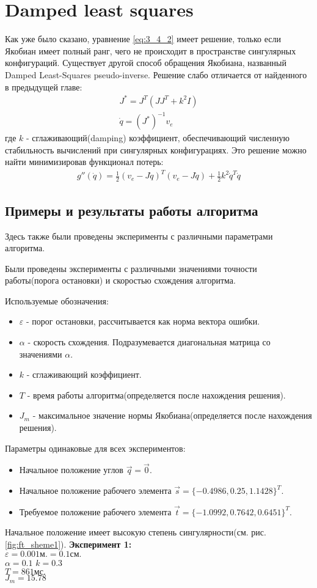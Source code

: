 \section{Damped least squares} \label{sect:3_5}
Как уже было сказано, уравнение \ref{eq:3_4_2} имеет решение, только если Якобиан имеет полный ранг, чего не происходит в пространстве сингулярных конфигураций. Существует другой способ обращения Якобиана, названный Damped Least-Squares pseudo-inverse. Решение слабо отличается от найденного в предыдущей главе:
\begin{align}
	J^{*} = J^{T}(JJ^{T} + k^{2}I)\\
	\dot{q} = (J^{*})^{-1}v_{e}
\end{align}
где $k$ - сглаживающий(damping) коэффициент, обеспечивающий численную стабильность вычислений при сингулярных конфигурациях. Это решение можно найти минимизировав функционал потерь\cite{Bruno}:
\begin{align}
	g''(\dot{q}) = \frac{1}{2}(v_{e} - J\dot{q})^{T}(v_{e} - J\dot{q}) + \frac{1}{2}k^{2}\dot{q}^{T}\dot{q}
\end{align}

\subsection{Примеры и результаты работы алгоритма}\label{subsect:3_5_1}
Здесь также были проведены эксперименты с различными параметрами алгоритма.

	Были проведены эксперименты с различными значениями точности работы(порога остановки) и скоростью схождения алгоритма.

Используемые обозначения:
\begin{itemize}
	\item $\varepsilon$ - порог остановки, рассчитывается как норма вектора ошибки.
	\item $\alpha$ - скорость схождения. Подразумевается диагональная матрица со значениями $\alpha$.
	\item $k$ - сглаживающий коэффициент.
	\item $T$ - время работы алгоритма(определяется после нахождения решения).
	\item $J_{m}$ - максимальное значение нормы Якобиана(определяется после нахождения решения).
\end{itemize}
\bigbreak
Параметры одинаковые для всех экспериментов:
\begin{itemize}
	\item 	Начальное положение углов $\vec{q} = \vec{0}$.
	\item	Начальное положение рабочего элемента $\vec{s} = \{-0.4986, 0.25, 1.1428\}^{T}$.
	\item	Требуемое положение рабочего элемента $\vec{t} = \{-1.0992, 0.7642, 0.6451\}^{T}$.
\end{itemize}
\bigbreak
Начальное положение имеет высокую степень сингулярности(см. рис. \ref{fig:ft_sheme1}). 
\bigbreak
\textbf{Эксперимент 1:}\\
$\varepsilon = 0.001\text{м.} = 0.1\text{см.}$\\
$\alpha = 0.1$
$k = 0.3$\\
$T = 861 \text{мс.}$\\
$J_{m} = 15.78$

